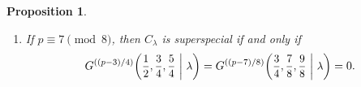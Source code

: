 \documentclass[10pt,a4paper]{amsart}
\newtheorem{Prop}[Def]{Proposition}
\begin{document}
\begin{Prop}
\begin{enumerate}
\begin{align*}
    = G^{((3p-7)/8)}\scalebox{0.95}{$\displaystyle\left(\frac{3}{4},\frac{7}{8},\frac{9}{8}\ \middle|\ \lambda\right)$} &= G^{((5p-9)/8)}\scalebox{0.95}{$\displaystyle\left(\frac{3}{4},\frac{9}{8},\frac{11}{8}\ \middle|\ \lambda\right)$} = 0.\\[-7.5mm]
\end{align*}
\item[(4)] If $p \equiv 7 \pmod{8}$, then $C_\lambda$ is superspecial if and only if\vspace{-1mm}
\[
    G^{((p-3)/4)}\scalebox{0.95}{$\displaystyle\left(\frac{1}{2},\frac{3}{4},\frac{5}{4}\ \middle|\ \lambda\right)$} = G^{((p-7)/8)}\scalebox{0.95}{$\displaystyle\left(\frac{3}{4},\frac{7}{8},\frac{9}{8}\ \middle|\ \lambda\right)$} = 0.\vspace{-2.3mm}
\]
\end{enumerate}
\end{Prop}
\end{document}
